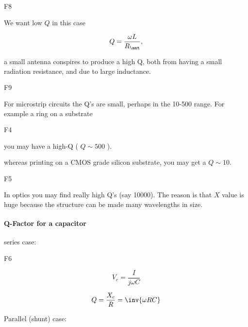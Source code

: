 F8

We want low \( Q \) in this case

\begin{dmath}\label{eqn:uwavesDeck8ResonatorQfactorCore:n}
Q = \frac{\omega L}{R_\ant},
\end{dmath}

a small antenna conspires to produce a high Q, both from having a small radiation resistance, and due to large inductance.

F9

For microstrip circuits the Q's are small, perhaps in the 10-500 range.  For example a ring on a substrate

F4

you may have a high-Q ( \( Q \sim 500 \) ).

whereas printing on a CMOS grade silicon substrate, you may get a \(Q \sim 10\).

F5

In optics you may find really high Q's (say 10000).  The reason is that \( X \) value is huge because the structure can be made many wavelengths in size.

\paragraph{Q-Factor for a capacitor}

series case:

F6

\begin{dmath}\label{eqn:uwavesDeck8ResonatorQfactorCore:320}
V_c = \frac{I}{j \omega C}
\end{dmath}

\begin{dmath}\label{eqn:uwavesDeck8ResonatorQfactorCore:n}
Q = \frac{X_c}{R} = \inv{\omega R C}
\end{dmath}

Parallel (shunt) case:

